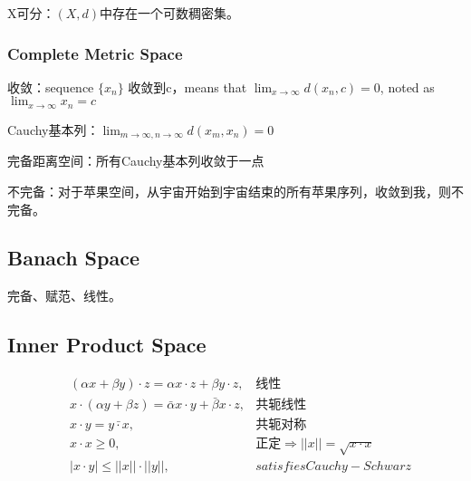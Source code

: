 \documentclass[UTF8]{../../09-Mathematics}
\begin{document}
\begin{definition}
    X可分：$(X,d)$中存在一个可数稠密集。
\end{definition}


\subsubsection{Complete Metric Space}

\begin{definition}
    收敛：sequence $\{ x_n \}$ 收敛到c，means that $\lim_{x \to \infty} d(x_n, c) = 0$, noted as $\lim_{x \to \infty} x_n = c $
\end{definition}

\begin{definition}
    Cauchy基本列：$\lim_{m \to \infty,n \to \infty}d(x_m, x_n)=0  $
\end{definition}

\begin{definition}
    完备距离空间：所有Cauchy基本列收敛于一点
\end{definition}

\begin{definition}
  不完备：对于苹果空间，从宇宙开始到宇宙结束的所有苹果序列，收敛到我，则不完备。
\end{definition}

\subsection{Banach Space}

完备、赋范、线性。


\subsection{Inner Product Space}

\begin{equation}\label{}
\begin{aligned}
  &(\alpha x + \beta y ) \cdot z = \alpha x \cdot z + \beta y \cdot z, &   \mbox{线性}\\
  &x \cdot (\alpha y + \beta z) = \bar{ \alpha}    x \cdot y + \bar{ \beta}    x \cdot z,&   \mbox{共轭线性}\\
  &x \cdot y = \bar{ y \cdot x}, &   \mbox{共轭对称}\\
  &x \cdot x \geqslant 0 , &\mbox{正定} \Rightarrow || x || = \sqrt{x \cdot x} \\
  &|x \cdot y| \leqslant || x || \cdot || y ||, &satisfies  Cauchy-Schwarz \\
\end{aligned}
\end{equation}
 
\end{document}
